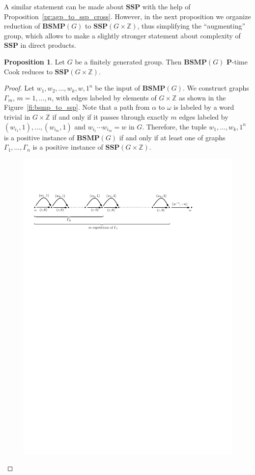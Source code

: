 \documentclass[10pt]{amsart}
\theoremstyle{definition}
\newtheorem{proposition}[theorem]{Proposition}
\def\P{{\mathbf{P}}}
\def\SSP{{\mathbf{SSP}}}
\def\BSMP{{\mathbf{BSMP}}}
\begin{document}
A similar statement can be made about $\SSP$ with the help of Proposition~\ref{pr:agp_to_ssp_cross}. %
However, in the next proposition we organize reduction of $\BSMP(G)$ to $\SSP(G\times \mathbb Z)$, thus simplifying the ``augmenting'' group, which allows to make a slightly stronger statement about complexity of $\SSP$ in direct products.

\begin{proposition}\label{pr:bsmp_to_ssp}
Let $G$ be a finitely generated group. Then $\BSMP(G)$ $\P$-time Cook reduces to $\SSP(G\times \mathbb Z)$.
\end{proposition}
\begin{proof} Let $w_1,w_2,\ldots, w_k, w, 1^n$ be the input of $\BSMP(G)$. We construct graphs $\Gamma_m$, $m=1,\ldots, n$, with edges labeled by elements of $G\times \mathbb Z$ as shown in the Figure~\ref{fi:bsmp_to_ssp}. Note that a path from $\alpha$ to $\omega$ is labeled by a word trivial in $G\times\mathbb Z$ if and only if it passes through exactly $m$ edges labeled by $(w_{i_1},1),\ldots,(w_{i_m},1)$ and $w_{i_1}\cdots w_{i_m}=w$ in $G$. Therefore, the tuple $w_1,\ldots,w_k,1^n$ is a positive instance of $\BSMP(G)$ if and only if at least one of graphs $\Gamma_1,\ldots, \Gamma_n$ is a positive instance of $\SSP(G\times\mathbb Z)$.
\begin{figure}[h]
 \centering
 \includegraphics[width=6in]{bsmp_to_ssp}

\end{figure}
\end{proof}
\end{document}
